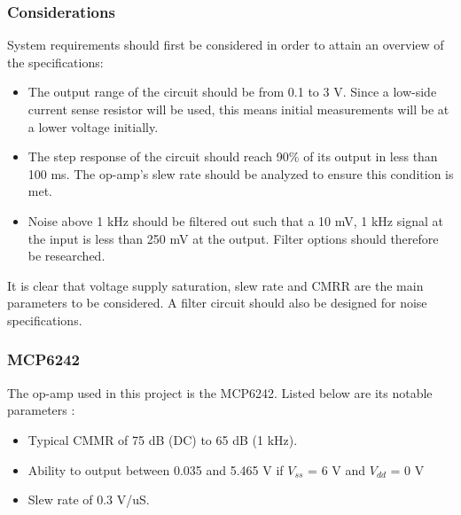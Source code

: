 \subsubsection{Considerations}\label{sec:opamps_considerations}
System requirements should first be considered in order to attain an overview of the specifications:
\begin{itemize}
    \item The output range of the circuit should be from 0.1 to 3 V. Since a low-side current sense resistor will be used, this means initial measurements will be at a lower voltage initially.
    \item The step response of the circuit should reach 90\% of its output in less than 100 ms. The op-amp's slew rate should be analyzed to ensure this condition is met.
    \item Noise above 1 kHz should be filtered out such that a 10 mV, 1 kHz signal at the input is less than 250 mV at the output. Filter options should therefore be researched.
\end{itemize}

It is clear that voltage supply saturation, slew rate and CMRR are the main parameters to be considered. A filter circuit should also be designed for noise specifications.

\subsubsection{MCP6242}\label{sec:opamps_MCP6242}
The op-amp used in this project is the MCP6242. Listed below are its notable parameters \cite{datasheetMCP6242}:
\begin{itemize}
    \item Typical CMMR of 75 dB (DC) to 65 dB (1 kHz).
    \item Ability to output between 0.035 and 5.465 V if $V_{ss}$ = 6 V and $V_{dd}$ = 0 V
    \item Slew rate of 0.3 V/uS.
\end{itemize}

